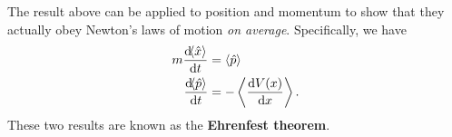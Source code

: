 \documentclass[../quantum_mechanics.tex]{subfiles}
\begin{document}
        The result above can be applied to position and momentum to show that they actually obey Newton's laws of motion \textit{on average}.
        Specifically, we have
        \begin{align}
            m\dv{\langle\hat{x}\rangle}{t}&=\langle\hat{p}\rangle\\
            \dv{\langle\hat{p}\rangle}{t}&=-\left\langle\dv{V(x)}{x}\right\rangle.
        \end{align}
        These two results are known as the \textbf{Ehrenfest theorem}.
\end{document}
